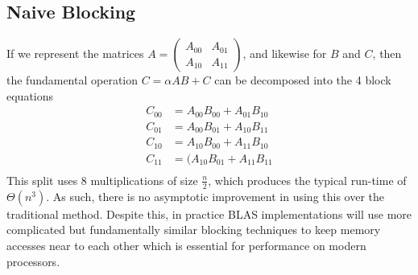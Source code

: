 \documentclass{article}         %
\begin{document}
\subsection*{Naive Blocking}
If we represent the matrices $A=\begin{pmatrix}
A_{00}&A_{01}\\A_{10}&A_{11}
\end{pmatrix}$, and likewise for $B$ and $C$, then the fundamental operation $C = \alpha AB+C$ can be decomposed into the 4 block equations 
\begin{equation}
\begin{split}
C_{00}&=A_{00}B_{00}+A_{01}B_{10}\\
C_{01}&=A_{00}B_{01}+A_{10}B_{11}\\
C_{10}&=A_{10}B_{00}+A_{11}B_{10}\\
C_{11}&=(A_{10}B_{01}+A_{11}B_{11}\\
\end{split}
\end{equation}
This split uses 8 multiplications of size $\frac n2$, which produces the typical run-time of $\Theta(n^3)$. As such, there is no asymptotic improvement in using this over the traditional method. Despite this, in practice BLAS implementations will use more complicated but fundamentally similar blocking techniques to keep memory accesses near to each other which is essential for performance on modern processors.
\end{document}
